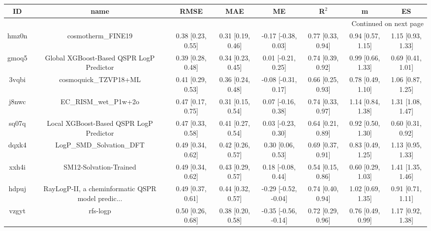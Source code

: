 \documentclass{article}
\begin{document}
\begin{center}
\begin{longtable}{|cccccccc|}
\toprule
    ID &                                               name &               RMSE &                MAE &                    ME &              R$^2$ &                    m &                    ES \\
\midrule
\endhead
\midrule
\multicolumn{8}{r}{{Continued on next page}} \\
\midrule
\endfoot

\bottomrule
\endlastfoot
 hmz0n &                                 cosmotherm\_FINE19 &  0.38 [0.23, 0.55] &  0.31 [0.19, 0.46] &   -0.17 [-0.38, 0.03] &  0.77 [0.33, 0.94] &    0.94 [0.57, 1.15] &     1.15 [0.93, 1.33] \\
 gmoq5 &           Global XGBoost-Based QSPR LogP Predictor &  0.39 [0.28, 0.48] &  0.34 [0.23, 0.45] &    0.01 [-0.21, 0.25] &  0.74 [0.39, 0.92] &    0.99 [0.66, 1.33] &     0.69 [0.41, 1.01] \\
 3vqbi &                              cosmoquick\_TZVP18+ML &  0.41 [0.29, 0.53] &  0.36 [0.24, 0.48] &   -0.08 [-0.31, 0.17] &  0.66 [0.25, 0.93] &    0.78 [0.49, 1.10] &     1.06 [0.87, 1.25] \\
 j8nwc &                              EC\_RISM\_wet\_P1w+2o &  0.47 [0.17, 0.75] &  0.31 [0.15, 0.54] &    0.07 [-0.16, 0.38] &  0.74 [0.33, 0.97] &    1.14 [0.84, 1.38] &     1.31 [1.08, 1.47] \\
 sq07q &            Local XGBoost-Based QSPR LogP Predictor &  0.47 [0.33, 0.58] &  0.41 [0.27, 0.54] &    0.03 [-0.23, 0.30] &  0.64 [0.21, 0.89] &    0.92 [0.50, 1.30] &     0.60 [0.31, 0.92] \\
 dqxk4 &                          LogP\_SMD\_Solvation\_DFT &  0.49 [0.34, 0.62] &  0.42 [0.26, 0.57] &     0.30 [0.06, 0.53] &  0.69 [0.37, 0.91] &    0.83 [0.49, 1.25] &     1.13 [0.95, 1.33] \\
 xxh4i &                             SM12-Solvation-Trained &  0.49 [0.34, 0.62] &  0.43 [0.29, 0.57] &    0.18 [-0.08, 0.44] &  0.54 [0.15, 0.86] &    0.60 [0.29, 1.03] &     1.41 [1.35, 1.46] \\
 hdpuj &  RayLogP-II, a cheminformatic QSPR model predic... &  0.49 [0.37, 0.61] &  0.44 [0.32, 0.57] &  -0.29 [-0.52, -0.04] &  0.74 [0.40, 0.94] &    1.02 [0.69, 1.35] &     0.91 [0.71, 1.11] \\
 vzgyt &                                           rfs-logp &  0.50 [0.26, 0.68] &  0.38 [0.20, 0.58] &  -0.35 [-0.56, -0.14] &  0.72 [0.29, 0.96] &    0.76 [0.49, 0.99] &     1.17 [0.92, 1.38] \\

\end{longtable}
\end{center}
\end{document}

